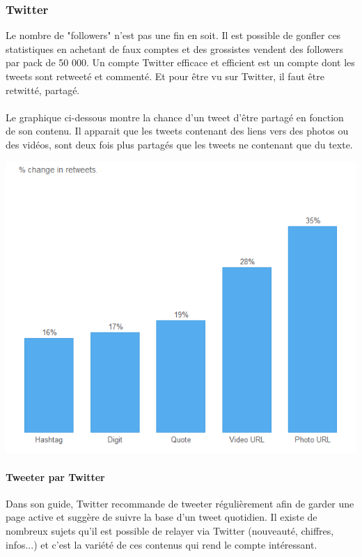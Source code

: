 \subsubsection{Twitter}
Le nombre de "followers" n'est pas une fin en soit. Il est possible de gonfler ces statistiques en achetant de faux comptes et des grossistes vendent 
des followers par pack de 50 000. Un compte Twitter efficace et efficient est un compte dont les tweets sont retweeté et commenté. Et pour être vu sur 
Twitter, il faut être retwitté, partagé.

\paragraph{}
Le graphique ci-dessous montre la chance d'un tweet d'être partagé en fonction de son contenu. Il apparait que les tweets contenant des liens vers des 
photos ou des vidéos, sont deux fois plus partagés que les tweets ne contenant que du texte.

\begin{center}
\includegraphics[scale=0.5]{./image/retweet.png}
\end{center}

\paragraph{Tweeter par Twitter ~~\\} 
Dans son guide, Twitter recommande de tweeter régulièrement afin de garder une page active et suggère de suivre la base d'un tweet quotidien.
Il existe de nombreux sujets qu'il est possible de relayer via Twitter (nouveauté, chiffres, infos...) et c'est la variété de ces contenus qui rend 
le compte intéressant.

